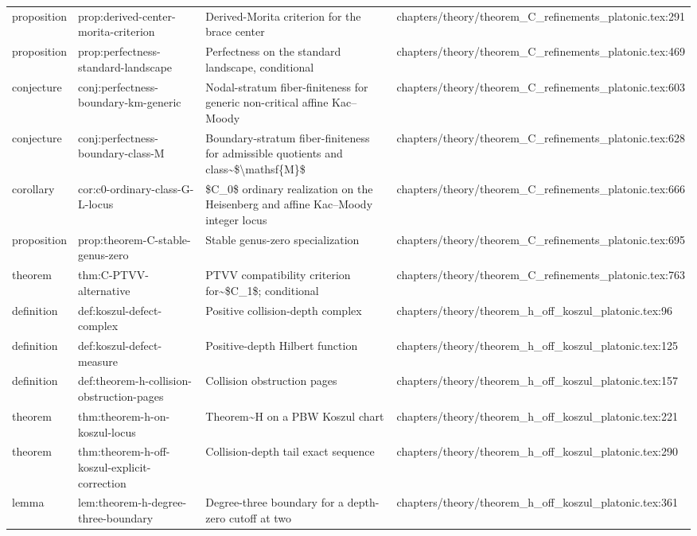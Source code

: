 \documentclass[11pt]{article}
\begin{document}
\begin{longtable}{L{0.10\textwidth}L{0.26\textwidth}L{0.42\textwidth}L{0.22\textwidth}}
proposition & prop:derived-center-morita-criterion & Derived-Morita criterion for the brace center & chapters/theory/theorem\_C\_refinements\_platonic.tex:291\\
proposition & prop:perfectness-standard-landscape & Perfectness on the standard landscape, cond{}itional & chapters/theory/theorem\_C\_refinements\_platonic.tex:469\\
conjecture & conj:perfectness-boundary-km-generic & Nodal-stratum fiber-finiteness for generic non-critical affine Kac--Moody & chapters/theory/theorem\_C\_refinements\_platonic.tex:603\\
conjecture & conj:perfectness-boundary-class-M & Boundary-stratum fiber-finiteness for admissible quotients and class\textasciitilde{}\$\textbackslash{}mathsf\{M\}\$ & chapters/theory/theorem\_C\_refinements\_platonic.tex:628\\
corollary & cor:c0-ordinary-class-G-L-locus & \$C\_0\$ ordinary realization on the Heisenberg and affine Kac--Moody integer locus & chapters/theory/theorem\_C\_refinements\_platonic.tex:666\\
proposition & prop:theorem-C-stable-genus-zero & Stable genus-zero specialization & chapters/theory/theorem\_C\_refinements\_platonic.tex:695\\
theorem & thm:C-PTVV-alternative & PTVV compatibility criterion for\textasciitilde{}\$C\_1\$; cond{}itional & chapters/theory/theorem\_C\_refinements\_platonic.tex:763\\
definition & def:koszul-defect-complex & Positive collision-depth complex & chapters/theory/theorem\_h\_off\_koszul\_platonic.tex:96\\
definition & def:koszul-defect-measure & Positive-depth Hilbert function & chapters/theory/theorem\_h\_off\_koszul\_platonic.tex:125\\
definition & def:theorem-h-collision-obstruction-pages & Collision obstruction pages & chapters/theory/theorem\_h\_off\_koszul\_platonic.tex:157\\
theorem & thm:theorem-h-on-koszul-locus & Theorem\textasciitilde{}H on a PBW Koszul chart & chapters/theory/theorem\_h\_off\_koszul\_platonic.tex:221\\
theorem & thm:theorem-h-off-koszul-explicit-correction & Collision-depth tail exact sequence & chapters/theory/theorem\_h\_off\_koszul\_platonic.tex:290\\
lemma & lem:theorem-h-degree-three-boundary & Degree-three boundary for a depth-zero cutoff at two & chapters/theory/theorem\_h\_off\_koszul\_platonic.tex:361\\

\end{longtable}
\end{document}
